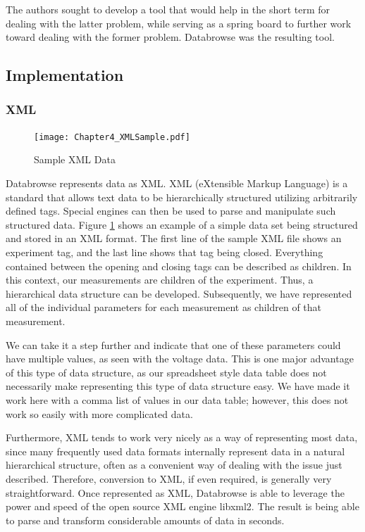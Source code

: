 \documentclass[10pt]{article}
\begin{document}
The authors sought to develop a tool that would help in the short term for dealing with the latter problem, while serving as a spring board to further work toward dealing with the former problem.  Databrowse was the resulting tool.

\subsection{Implementation}

\subsubsection{XML}

\begin{figure}
	\texttt{[image: Chapter4\_XMLSample.pdf]}
	\caption{Sample XML Data}
	\label{fig:4:xmlsample}
\end{figure}

Databrowse represents data as XML.  XML (eXtensible Markup Language) is a standard that allows text data to be hierarchically structured utilizing arbitrarily defined tags.  Special engines can then be used to parse and manipulate such structured data.  Figure \ref{fig:4:xmlsample} shows an example of a simple data set being structured and stored in an XML format.  The first line of the sample XML file shows an experiment tag, and the last line shows that tag being closed.  Everything contained between the opening and closing tags can be described as children.  In this context, our measurements are children of the experiment.  Thus, a hierarchical data structure can be developed.  Subsequently, we have represented all of the individual parameters for each measurement as children of that measurement.  

We can take it a step further and indicate that one of these parameters could have multiple values, as seen with the voltage data.  This is one major advantage of this type of data structure, as our spreadsheet style data table does not necessarily make representing this type of data structure easy.  We have made it work here with a comma list of values in our data table; however, this does not work so easily with more complicated data.

Furthermore, XML tends to work very nicely as a way of representing most data, since many frequently used data formats internally represent data in a natural hierarchical structure, often as a convenient way of dealing with the issue just described.  Therefore, conversion to XML, if even required, is generally very straightforward.  Once represented as XML, Databrowse is able to leverage the power and speed of the open source XML engine libxml2.  The result is being able to parse and transform considerable amounts of data in seconds.
\end{document}
